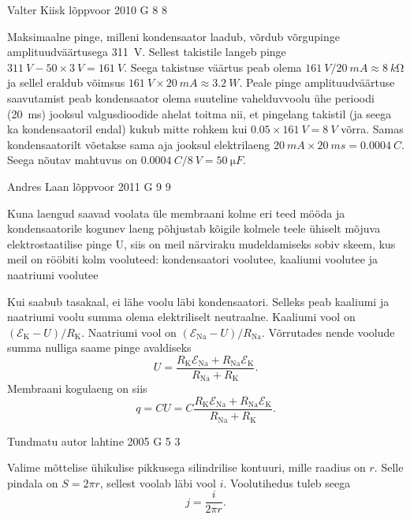 \documentclass[11pt]{article}
\begin{document}
{%
{Valter Kiisk} %
{lõppvoor} %
{2010} %
{G 8} %
{8} %
{

\ifSolution
Maksimaalne pinge, milleni kondensaator laadub, võrdub võrgupinge
amplituudväärtusega \SI{311}{V}. Sellest takistile langeb pinge
$\SI{311}{V}-\num{50}\times\SI{3}{V}=\SI{161}{V}$. Seega takistuse väärtus peab olema
$\SI{161}{V}/\SI{20}{mA}\approx\SI{8}{k\ohm}$ ja sellel eraldub võimsus
$\SI{161}{V}\times\SI{20}{mA}\approx\SI{3.2}{W}$. Peale pinge amplituudväärtuse
saavutamist peab kondensaator olema suuteline vahelduvvoolu ühe perioodi (\SI{20}{ms})
jooksul valgusdioodide ahelat toitma nii, et pingelang takistil (ja seega ka
kondensaatoril endal) kukub mitte rohkem kui $\num{0.05}\times\SI{161}{V}=\SI{8}{V}$
võrra. Samas kondensaatorilt võetakse sama aja jooksul elektrilaeng
$\SI{20}{mA}\times\SI{20}{ms}=\SI{0.0004}{C}$. Seega nõutav mahtuvus on
$\SI{0.0004}{C}/\SI{8}{V}=\SI{50}{\micro F}$.
\fi
}

{Andres Laan} %
{lõppvoor} %
{2011} %
{G 9} %
{9} %
{

\ifSolution
Kuna laengud saavad voolata üle membraani kolme eri teed mööda ja kondensaatorile kogunev laeng põhjustab kõigile kolmele teele ühiselt mõjuva elektrostaatilise
pinge U, siis on meil närviraku mudeldamiseks sobiv skeem, kus meil on rööbiti kolm
vooluteed: kondensaatori voolutee, kaaliumi voolutee ja naatriumi voolutee


Kui saabub tasakaal, ei lähe voolu läbi kondensaatori. Selleks peab kaaliumi ja naatriumi voolu summa olema elektriliselt neutraalne. Kaaliumi vool on $(\mathcal{E}_{\mathrm{K}} - U)/R_\mathrm{K}$.
Naatriumi vool on $(\mathcal{E}_{\mathrm{Na}} - U)/R_{\mathrm{Na}}$. Võrrutades nende voolude summa nulliga saame
pinge avaldiseks
\[
U=\frac{R_{\mathrm{K}} \mathcal{E}_{\mathrm{Na}}+R_{\mathrm{Na}} \mathcal{E}_{\mathrm{K}}}{R_{\mathrm{Na}}+R_{\mathrm{K}}}.
\]
Membraani kogulaeng on siis
\[
q=C U=C \frac{R_{\mathrm{K}} \mathcal{E}_{\mathrm{Na}}+R_{\mathrm{Na}} \mathcal{E}_{\mathrm{K}}}{R_{\mathrm{Na}}+R_{\mathrm{K}}}.
\]
\fi
}

{Tundmatu autor} %
{lahtine} %
{2005} %
{G 5} %
{3} %
{

\ifSolution
Valime mõttelise ühikulise pikkusega silindrilise kontuuri, mille raadius on $r$. Selle
pindala on $S = 2\pi r$, sellest voolab läbi vool $i$. Voolutihedus tuleb seega
\[
j = \frac{i}{2\pi r}.
\]
\fi
}

}
\end{document}
